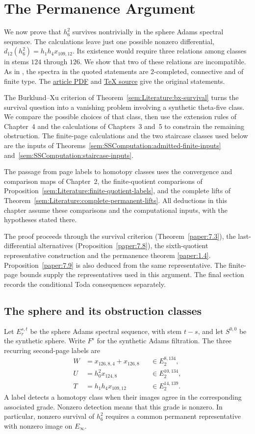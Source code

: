 \chapter{The Permanence Argument}
We now prove that $h_6^2$ survives nontrivially in the sphere Adams
spectral sequence. The calculations leave just one possible nonzero differential,
$d_{12}(h_6^2)=h_1h_4x_{109,12}$. Its existence would require three
relations among classes in stems $124$ through $126$. We show that two
of these relations are incompatible.
As in \cite{LWX126}, the spectra in the quoted statements are
$2$-completed, connective and of finite type. The
\href{paper/2412.10879.pdf}{article PDF} and
\href{paper/main.tex.html}{TeX source} give the original statements.

The Burklund--Xu criterion of Theorem~\ref{sem:Literature:bx-survival}
turns the survival question into a vanishing problem involving a
synthetic theta-five class. We compare the possible choices of that
class, then use the extension rules of Chapter~4 and the calculations
of Chapters~3 and~5 to constrain the remaining obstruction.
The finite-page calculations and the two staircase classes used below
are the inputs of
Theorems~\ref{sem:SSComputation:admitted-finite-inputs}
and~\ref{sem:SSComputation:staircase-inputs}.

The passage from page labels to homotopy classes uses the convergence
and comparison maps of Chapter~2, the finite-quotient comparisons of
Proposition~\ref{sem:Literature:finite-quotient-labels}, and the complete
lifts of Theorem~\ref{sem:Literature:complete-permanent-lifts}.
All deductions in this chapter assume these comparisons and the
computational inputs, with the hypotheses stated there.

The proof proceeds through the survival criterion
(Theorem~\ref{paper:7.3}), the last-differential alternatives
(Proposition~\ref{paper:7.8}), the sixth-quotient representative construction
and the permanence theorem \ref{paper:1.4}. Proposition~\ref{paper:7.9}
is also deduced from the same representative. The finite-page bounds supply
the representatives used in this argument. The final section
records the conditional Toda consequences separately.

\section{The sphere and its obstruction classes}
Let $E_r^{s,t}$ be the sphere Adams spectral sequence, with stem $t-s$,
and let $S^{0,0}$ be the synthetic sphere. Write $F^s$ for the
synthetic Adams filtration. The three recurring second-page labels are
\[
 \begin{aligned}
 W&=x_{126,8,4}+x_{126,8}&&\in E_2^{8,134},\\
 U&=h_0^2x_{124,8}&&\in E_2^{10,134},\\
 T&=h_1h_4x_{109,12}&&\in E_2^{14,139}.
 \end{aligned}
\]
A label detects a homotopy class when their images agree in the
corresponding associated grade. Nonzero detection means that this grade
is nonzero. In particular, nonzero survival of $h_6^2$ requires a common
permanent representative with nonzero image on $E_\infty$.

